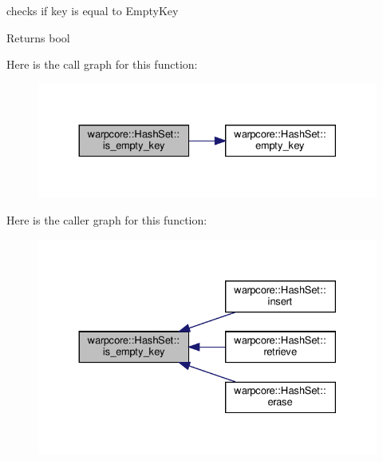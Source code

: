 checks if {\ttfamily key} is equal to {\ttfamily Empty\+Key} 

\begin{DoxyReturn}{Returns}
{\ttfamily bool} 
\end{DoxyReturn}
Here is the call graph for this function\+:
\nopagebreak
\begin{figure}[H]
\begin{center}
\leavevmode
\includegraphics[width=330pt]{classwarpcore_1_1HashSet_ade9bc606ceba67c90aac5ee3aa43ddc7_cgraph}
\end{center}
\end{figure}
Here is the caller graph for this function\+:
\nopagebreak
\begin{figure}[H]
\begin{center}
\leavevmode
\includegraphics[width=330pt]{classwarpcore_1_1HashSet_ade9bc606ceba67c90aac5ee3aa43ddc7_icgraph}
\end{center}
\end{figure}
\mbox{\label{classwarpcore_1_1HashSet_a74f48068d148b071761b1c214501770a}} 
